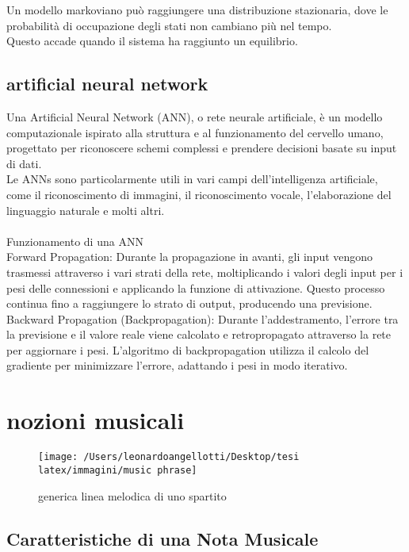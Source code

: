 \documentclass[a4paper,12pt]{report}
\begin{document}
Un modello markoviano può raggiungere una distribuzione stazionaria, dove le probabilità di occupazione degli stati non cambiano più nel tempo. \\
Questo accade quando il sistema ha raggiunto un equilibrio. \\

\subsection{artificial neural network}

Una Artificial Neural Network (ANN), o rete neurale artificiale, è un modello computazionale ispirato alla struttura e al funzionamento del cervello umano, progettato per riconoscere schemi complessi e prendere decisioni basate su input di dati. \\
Le ANNs sono particolarmente utili in vari campi dell'intelligenza artificiale, come il riconoscimento di immagini, il riconoscimento vocale, l'elaborazione del linguaggio naturale e molti altri. \\
\\
Funzionamento di una ANN
\\
Forward Propagation: Durante la propagazione in avanti, gli input vengono trasmessi attraverso i vari strati della rete, moltiplicando i valori degli input per i pesi delle connessioni e applicando la funzione di attivazione. Questo processo continua fino a raggiungere lo strato di output, producendo una previsione.
\\
Backward Propagation (Backpropagation): Durante l'addestramento, l'errore tra la previsione e il valore reale viene calcolato e retropropagato attraverso la rete per aggiornare i pesi. L'algoritmo di backpropagation utilizza il calcolo del gradiente per minimizzare l'errore, adattando i pesi in modo iterativo.

\section{nozioni musicali}

\begin{figure}[h!]
    \centering
    \texttt{[image: /Users/leonardoangellotti/Desktop/tesi latex/immagini/music phrase]} 
    \caption{generica linea melodica di uno spartito}
    \label{fig:immagine}
\end{figure}

\subsection{Caratteristiche di una Nota Musicale}
\end{document}
